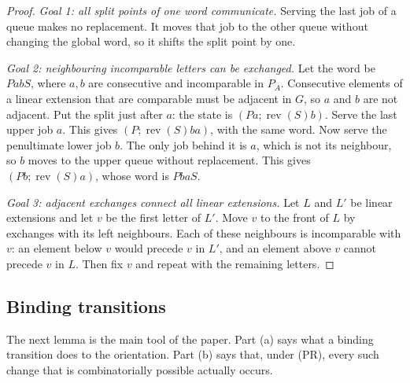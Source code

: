 \documentclass[11pt,a4paper]{article}
\theoremstyle{plain}
\theoremstyle{plain}
\newcommand{\rev}{\operatorname{rev}}
\begin{document}
\begin{proof}
\emph{Goal 1: all split points of one word communicate.} Serving the last job of a queue makes no replacement. It moves that job to the other queue without changing the global word, so it shifts the split point by one.

\emph{Goal 2: neighbouring incomparable letters can be exchanged.} Let the word be $PabS$, where $a,b$ are consecutive and incomparable in $P_A$. Consecutive elements of a linear extension that are comparable must be adjacent in $G$, so $a$ and $b$ are not adjacent. Put the split just after $a$: the state is $(Pa;\rev(S)b)$. Serve the last upper job $a$. This gives $(P;\rev(S)ba)$, with the same word. Now serve the penultimate lower job $b$. The only job behind it is $a$, which is not its neighbour, so $b$ moves to the upper queue without replacement. This gives $(Pb;\rev(S)a)$, whose word is $PbaS$.

\emph{Goal 3: adjacent exchanges connect all linear extensions.} Let $L$ and $L'$ be linear extensions and let $v$ be the first letter of $L'$. Move $v$ to the front of $L$ by exchanges with its left neighbours. Each of these neighbours is incomparable with $v$: an element below $v$ would precede $v$ in $L'$, and an element above $v$ cannot precede $v$ in $L$. Then fix $v$ and repeat with the remaining letters.
\end{proof}

\subsection{Binding transitions}

The next lemma is the main tool of the paper. Part (a) says what a binding transition does to the orientation. Part (b) says that, under (PR), every such change that is combinatorially possible actually occurs.
\end{document}
